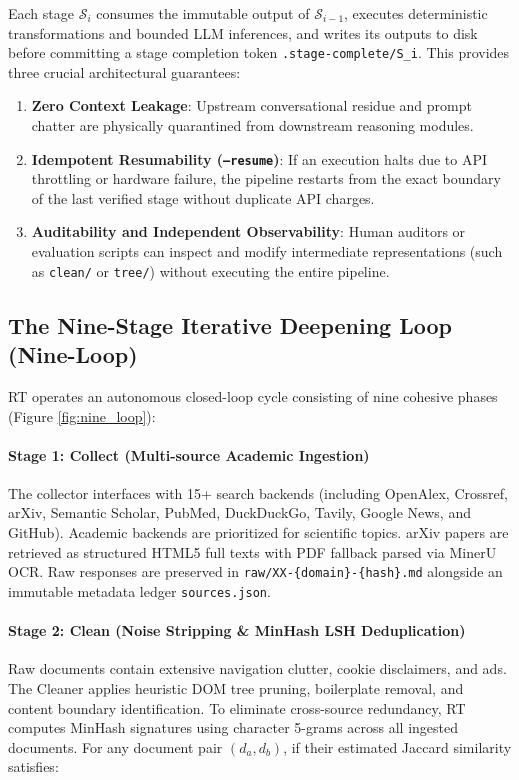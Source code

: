 \documentclass[11pt,a4paper]{article}
\begin{document}
Each stage $\mathcal{S}_i$ consumes the immutable output of $\mathcal{S}_{i-1}$, executes deterministic transformations and bounded LLM inferences, and writes its outputs to disk before committing a stage completion token \texttt{.stage-complete/S\_i}. This provides three crucial architectural guarantees:
\begin{enumerate}
    \item \textbf{Zero Context Leakage}: Upstream conversational residue and prompt chatter are physically quarantined from downstream reasoning modules.
    \item \textbf{Idempotent Resumability (\texttt{--resume})}: If an execution halts due to API throttling or hardware failure, the pipeline restarts from the exact boundary of the last verified stage without duplicate API charges.
    \item \textbf{Auditability and Independent Observability}: Human auditors or evaluation scripts can inspect and modify intermediate representations (such as \texttt{clean/} or \texttt{tree/}) without executing the entire pipeline.
\end{enumerate}

\subsection{The Nine-Stage Iterative Deepening Loop (Nine-Loop)}

RT operates an autonomous closed-loop cycle consisting of nine cohesive phases (Figure \ref{fig:nine_loop}):

\paragraph{Stage 1: Collect (Multi-source Academic Ingestion)}
The collector interfaces with 15+ search backends (including OpenAlex, Crossref, arXiv, Semantic Scholar, PubMed, DuckDuckGo, Tavily, Google News, and GitHub). Academic backends are prioritized for scientific topics. arXiv papers are retrieved as structured HTML5 full texts with PDF fallback parsed via MinerU OCR. Raw responses are preserved in \texttt{raw/XX-\{domain\}-\{hash\}.md} alongside an immutable metadata ledger \texttt{sources.json}.

\paragraph{Stage 2: Clean (Noise Stripping \& MinHash LSH Deduplication)}
Raw documents contain extensive navigation clutter, cookie disclaimers, and ads. The Cleaner applies heuristic DOM tree pruning, boilerplate removal, and content boundary identification. To eliminate cross-source redundancy, RT computes MinHash signatures using character 5-grams across all ingested documents. For any document pair $(d_a, d_b)$, if their estimated Jaccard similarity satisfies:
\end{document}
